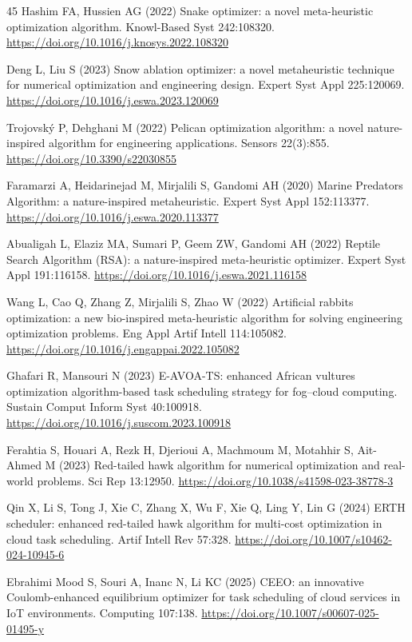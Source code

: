 \documentclass[pdflatex,onecolumn,sn-mathphys-num]{sn-jnl}
\begin{document}
\begin{thebibliography}{45}
Hashim FA, Hussien AG (2022) Snake optimizer: a novel meta-heuristic optimization algorithm. Knowl-Based Syst 242:108320. \url{https://doi.org/10.1016/j.knosys.2022.108320}

Deng L, Liu S (2023) Snow ablation optimizer: a novel metaheuristic technique for numerical optimization and engineering design. Expert Syst Appl 225:120069. \url{https://doi.org/10.1016/j.eswa.2023.120069}

Trojovsk\'{y} P, Dehghani M (2022) Pelican optimization algorithm: a novel nature-inspired algorithm for engineering applications. Sensors 22(3):855. \url{https://doi.org/10.3390/s22030855}

Faramarzi A, Heidarinejad M, Mirjalili S, Gandomi AH (2020) Marine Predators Algorithm: a nature-inspired metaheuristic. Expert Syst Appl 152:113377. \url{https://doi.org/10.1016/j.eswa.2020.113377}

Abualigah L, Elaziz MA, Sumari P, Geem ZW, Gandomi AH (2022) Reptile Search Algorithm (RSA): a nature-inspired meta-heuristic optimizer. Expert Syst Appl 191:116158. \url{https://doi.org/10.1016/j.eswa.2021.116158}

Wang L, Cao Q, Zhang Z, Mirjalili S, Zhao W (2022) Artificial rabbits optimization: a new bio-inspired meta-heuristic algorithm for solving engineering optimization problems. Eng Appl Artif Intell 114:105082. \url{https://doi.org/10.1016/j.engappai.2022.105082}

Ghafari R, Mansouri N (2023) E-AVOA-TS: enhanced African vultures optimization algorithm-based task scheduling strategy for fog--cloud computing. Sustain Comput Inform Syst 40:100918. \url{https://doi.org/10.1016/j.suscom.2023.100918}

Ferahtia S, Houari A, Rezk H, Djerioui A, Machmoum M, Motahhir S, Ait-Ahmed M (2023) Red-tailed hawk algorithm for numerical optimization and real-world problems. Sci Rep 13:12950. \url{https://doi.org/10.1038/s41598-023-38778-3}

Qin X, Li S, Tong J, Xie C, Zhang X, Wu F, Xie Q, Ling Y, Lin G (2024) ERTH scheduler: enhanced red-tailed hawk algorithm for multi-cost optimization in cloud task scheduling. Artif Intell Rev 57:328. \url{https://doi.org/10.1007/s10462-024-10945-6}

Ebrahimi Mood S, Souri A, Inanc N, Li KC (2025) CEEO: an innovative Coulomb-enhanced equilibrium optimizer for task scheduling of cloud services in IoT environments. Computing 107:138. \url{https://doi.org/10.1007/s00607-025-01495-y}


\end{thebibliography}
\end{document}
